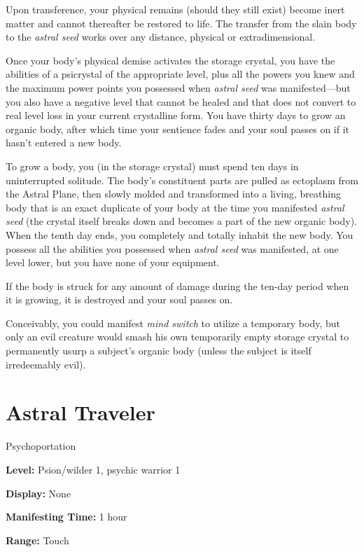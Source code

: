 \documentclass{article}
\begin{document}
Upon transference, your physical remains (should they still exist) become inert 
matter and cannot thereafter be restored to life. The transfer from the slain body 
to the \textit{astral seed }works over any distance, physical or extradimensional.

Once your body's physical demise activates the storage crystal, you have the abilities 
of a psicrystal of the appropriate level, plus all the powers you knew and the 
maximum power points you possessed when \textit{astral seed }was manifested---but 
you also have a negative level that cannot be healed and that does not convert 
to real level loss in your current crystalline form. You have thirty days to grow 
an organic body, after which time your sentience fades and your soul passes on 
if it hasn't entered a new body.

To grow a body, you (in the storage crystal) must spend ten days in uninterrupted 
solitude. The body's constituent parts are pulled as ectoplasm from the Astral 
Plane, then slowly molded and transformed into a living, breathing body that is 
an exact duplicate of your body at the time you manifested \textit{astral seed 
}(the crystal itself breaks down and becomes a part of the new organic body). When 
the tenth day ends, you completely and totally inhabit the new body. You possess 
all the abilities you possessed when \textit{astral seed }was manifested, at one 
level lower, but you have none of your equipment.

If the body is struck for any amount of damage during the ten-day period when it 
is growing, it is destroyed and your soul passes on.

Conceivably, you could manifest \textit{mind switch }to utilize a temporary body, 
but only an evil creature would smash his own temporarily empty storage crystal 
to permanently usurp a subject's organic body (unless the subject is itself irredeemably 
evil).

\vspace{12pt}
\section*{Astral Traveler}

Psychoportation

\textbf{Level:} Psion/wilder 1, psychic warrior 1

\textbf{Display:} None

\textbf{Manifesting Time:} 1 hour

\textbf{Range:} Touch
\end{document}
